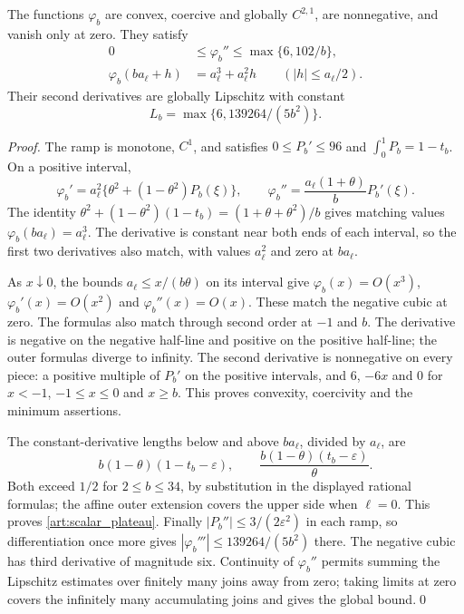 \begin{lemma}\label{art:upper_scalar_lemma}
The functions $\varphi_b$ are convex, coercive and globally $C^{2,1}$,
are nonnegative, and vanish only at zero. They satisfy
\begin{align}
 0&\le\varphi_b''\le\max\{6,102/b\},\label{art:scalar_curvature}\\
 \varphi_b(ba_\ell+h)&=a_\ell^3+a_\ell^2h
       \qquad(|h|\le a_\ell/2).\label{art:scalar_plateau}
\end{align}
Their second derivatives are globally Lipschitz with constant
\[
 L_b=\max\{6,139264/(5b^2)\}.
\]
\end{lemma}
\begin{proof}
The ramp is monotone, $C^1$, and satisfies
$0\le P_b'\le96$ and $\int_0^1P_b=1-t_b$. On a positive interval,
\[
 \varphi_b'=a_\ell^2\{\theta^2+(1-\theta^2)P_b(\xi)\},\qquad
 \varphi_b''=\frac{a_\ell(1+\theta)}bP_b'(\xi).
\]
The identity
$\theta^2+(1-\theta^2)(1-t_b)=(1+\theta+\theta^2)/b$
gives matching values $\varphi_b(ba_\ell)=a_\ell^3$. The derivative is
constant near both ends of each interval, so the first two derivatives
also match, with values $a_\ell^2$ and zero at $ba_\ell$.

As $x\downarrow0$, the bounds $a_\ell\le x/(b\theta)$ on its interval
give $\varphi_b(x)=O(x^3)$, $\varphi_b'(x)=O(x^2)$ and
$\varphi_b''(x)=O(x)$. These match the negative cubic at zero.
The formulas also match through second order at $-1$ and $b$.
The derivative is negative on the negative half-line and positive on the
positive half-line; the outer formulas diverge to infinity. The second
derivative is nonnegative on every piece: a positive multiple of $P_b'$ on the
positive intervals, and $6$, $-6x$ and $0$ for $x<-1$, $-1\le x\le0$ and
$x\ge b$. This proves convexity, coercivity and the minimum assertions.

The constant-derivative lengths below and above $ba_\ell$, divided by $a_\ell$,
are
\[
 b(1-\theta)(1-t_b-\varepsilon),\qquad
 \frac{b(1-\theta)(t_b-\varepsilon)}\theta.
\]
Both exceed $1/2$ for $2\le b\le34$, by substitution in the displayed
rational formulas; the affine outer extension covers the upper side when
$\ell=0$. This proves \eqref{art:scalar_plateau}.
Finally $|P_b''|\le3/(2\varepsilon^2)$ in each ramp, so differentiation
once more gives $|\varphi_b'''|\le139264/(5b^2)$ there. The negative
cubic has third derivative of magnitude six. Continuity of
$\varphi_b''$ permits summing the Lipschitz estimates over finitely many
joins away from zero; taking limits at zero covers the infinitely many
accumulating joins and gives the global bound.\qed
\end{proof}

